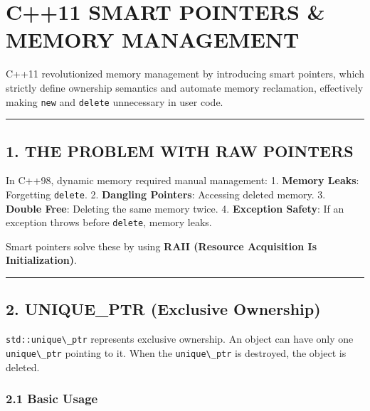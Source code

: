\hypertarget{c11-smart-pointers-memory-management}{%
\chapter{C++11 SMART POINTERS \& MEMORY
MANAGEMENT}\label{c11-smart-pointers-memory-management}}

C++11 revolutionized memory management by introducing smart pointers,
which strictly define ownership semantics and automate memory
reclamation, effectively making \passthrough{\lstinline!new!} and
\passthrough{\lstinline!delete!} unnecessary in user code.

\begin{center}\rule{0.5\linewidth}{0.5pt}\end{center}

\hypertarget{the-problem-with-raw-pointers}{%
\section{1. THE PROBLEM WITH RAW
POINTERS}\label{the-problem-with-raw-pointers}}

In C++98, dynamic memory required manual management: 1. \textbf{Memory
Leaks}: Forgetting \passthrough{\lstinline!delete!}. 2. \textbf{Dangling
Pointers}: Accessing deleted memory. 3. \textbf{Double Free}: Deleting
the same memory twice. 4. \textbf{Exception Safety}: If an exception
throws before \passthrough{\lstinline!delete!}, memory leaks.

Smart pointers solve these by using \textbf{RAII (Resource Acquisition
Is Initialization)}.

\begin{center}\rule{0.5\linewidth}{0.5pt}\end{center}

\hypertarget{unique_ptr-exclusive-ownership}{%
\section{2. UNIQUE\_PTR (Exclusive
Ownership)}\label{unique_ptr-exclusive-ownership}}

\passthrough{\lstinline!std::unique\_ptr!} represents exclusive
ownership. An object can have only one
\passthrough{\lstinline!unique\_ptr!} pointing to it. When the
\passthrough{\lstinline!unique\_ptr!} is destroyed, the object is
deleted.

\hypertarget{basic-usage}{%
\subsection{2.1 Basic Usage}\label{basic-usage}}

